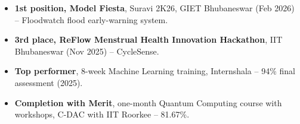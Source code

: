 
\begin{itemize}
\item \textbf{1st position, Model Fiesta}, Suravi 2K26, GIET Bhubaneswar (Feb 2026) -- Floodwatch flood early-warning system.
\item \textbf{3rd place, ReFlow Menstrual Health Innovation Hackathon}, IIT Bhubaneswar (Nov 2025) -- CycleSense.
\item \textbf{Top performer}, 8-week Machine Learning training, Internshala -- 94\% final assessment (2025).
\item \textbf{Completion with Merit}, one-month Quantum Computing course with workshops, C-DAC with IIT Roorkee -- 81.67\%.
\end{itemize}
